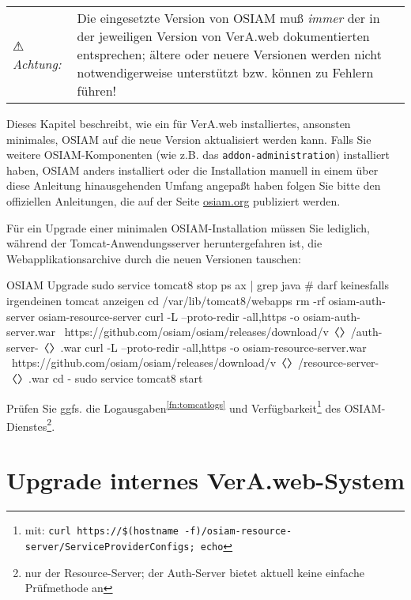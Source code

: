 \documentclass{tarentanleitung}
\newcommand{\vwiaversosiam}{2.5}
\begin{document}
\begin{tabu}{@{}l@{ }X@{}}
⚠ \emph{Achtung:} & Die eingesetzte Version von OSIAM muß \emph{immer} der
in der jeweiligen Version von VerA.web dokumentierten entsprechen; ältere
oder neuere Versionen werden nicht notwendigerweise unterstützt bzw. können
zu Fehlern führen!
\end{tabu}

Dieses Kapitel beschreibt, wie ein für VerA.web installiertes,
ansonsten minimales, OSIAM auf die neue Version aktualisiert
werden kann. Falls Sie weitere OSIAM-Komponenten (wie z.B.
das \texttt{addon-administration}) installiert haben, OSIAM
anders installiert oder die Installation manuell in einem
über diese Anleitung hinausgehenden Umfang angepaßt haben
folgen Sie bitte den offiziellen Anleitungen, die auf der
Seite \href{http://osiam.org/}{osiam.org} publiziert werden.

\begin{minipage}{\linewidth}
Für ein Upgrade einer minimalen OSIAM-Installation müssen Sie
lediglich, während der Tomcat-Anwendungsserver heruntergefahren
ist, die Webapplikationsarchive durch die neuen Versionen tauschen:

\begin{lstdump}{OSIAM Upgrade}
sudo service tomcat8 stop
ps ax | grep java               # darf keinesfalls irgendeinen tomcat anzeigen
cd /var/lib/tomcat8/webapps
rm -rf osiam-auth-server osiam-resource-server
curl -L --proto-redir -all,https -o osiam-auth-server.war \
    https://github.com/osiam/osiam/releases/download/v〈\lstdumpesc{\vwiaversosiam}〉/auth-server-〈\lstdumpesc{\vwiaversosiam}〉.war
curl -L --proto-redir -all,https -o osiam-resource-server.war \
    https://github.com/osiam/osiam/releases/download/v〈\lstdumpesc{\vwiaversosiam}〉/resource-server-〈\lstdumpesc{\vwiaversosiam}〉.war
cd -
sudo service tomcat8 start
\end{lstdump}
\end{minipage}

Prüfen Sie ggfs. die Logausgaben\Hair\textsuperscript{\ref{fn:tomcatlogs}}
und Verfügbarkeit\Hair\footnote{\label{fn:osiamcheck}mit:
\texttt{curl https://\$(hostname -f)/osiam-resource-server/ServiceProviderConfigs; echo}%
} des OSIAM-Dienstes\Hair\footnote{\label{fn:osiamsvcchk}nur der
Resource-Server; der Auth-Server bietet aktuell keine einfache Prüfmethode an}.

\fi%

\section{Upgrade internes VerA.web-System}\label{sec:upgrade-int}
\end{document}
